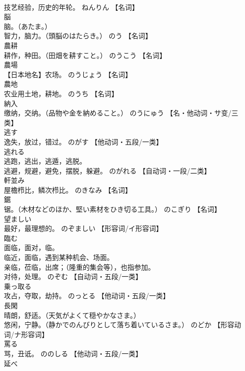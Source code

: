 \documentclass[8pt]{extreport}
\begin{document}
\begin{CJK}{UTF8}{min}
\\	技艺经验，历史的年轮。	ねんりん		【名词】
\\	脳	
\\	脑。（あたま。） 
\\	智力，脑力。（頭脳のはたらき。）	のう		【名词】
\\	農耕	
\\	耕作，种田。（田畑を耕すこと。）	のうこう		【名词】
\\	農場	
\\	【日本地名】农场。	のうじょう		【名词】
\\	農地	
\\	农业用土地，耕地。	のうち		【名词】
\\	納入	
\\	缴纳，交纳。（品物や金を納めること。）	のうにゅう		【名・他动词・サ变/三类】
\\	逃す	
\\	逸失，放过，错过。	のがす		【他动词・五段/一类】
\\	逃れる	
\\	逃跑，逃出，逃遁，逃脱。 
\\	逃避，规避，避免，摆脱，躲避。	のがれる		【自动词・一段/二类】
\\	軒並み	
\\	屋檐栉比，鳞次栉比。	のきなみ		【名词】
\\	鋸	
\\	锯。（木材などのほか、堅い素材をひき切る工具。）	のこぎり		【名词】
\\	望ましい	
\\	最好，最理想的。	のぞましい		【形容词/イ形容词】
\\	臨む	
\\	面临，面对，临。 
\\	临近，面临，遇到某种机会、场面。 
\\	亲临，莅临，出席；（隆重的集会等），也指参加。 
\\	对待，处理。	のぞむ		【自动词・五段/一类】
\\	乗っ取る	
\\	攻占，夺取，劫持。	のっとる		【他动词・五段/一类】
\\	長閑	
\\	晴朗，舒适。（天気がよくて穏やかなさま。） 
\\	悠闲，宁静。（静かでのんびりとして落ち着いているさま。）	のどか		【形容动词/ナ形容词】
\\	罵る	
\\	骂，丑诋。	ののしる		【他动词・五段/一类】
\\	延べ	

\end{CJK}
\end{document}
